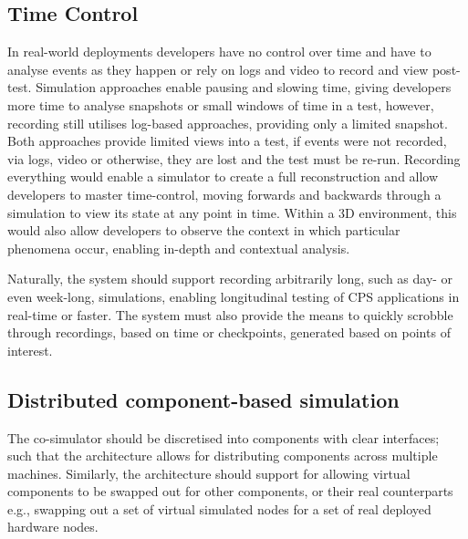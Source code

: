 \subsection{Time Control}
\label{sub:requirements_Time Control}
In real-world deployments developers have no control over time and have to analyse events as they happen or rely on logs and video to record and view post-test. Simulation approaches enable pausing and slowing time, giving developers more time to analyse snapshots or small windows of time in a test, however, recording still utilises log-based approaches, providing only a limited snapshot. Both approaches provide limited views into a test, if events were not recorded, via logs, video or otherwise, they are lost and the test must be re-run.
Recording everything would enable a simulator to create a full reconstruction and allow developers to master time-control, moving forwards and backwards through a simulation to view its state at any point in time. Within a 3D environment, this would also allow developers to observe the context in which particular phenomena occur, enabling in-depth and contextual analysis.

Naturally, the system should support recording arbitrarily long, such as day- or even week-long, simulations, enabling longitudinal testing of CPS applications in real-time or faster. The system must also provide the means to quickly scrobble through recordings, based on time or checkpoints, generated based on points of interest.

\subsection{Distributed component-based simulation} %
\label{sub:distributed}
The co-simulator should be discretised into components with clear interfaces; such that the architecture allows for distributing components across multiple machines. Similarly, the architecture should support for allowing virtual components to be swapped out for other components, or their real counterparts e.g., swapping out a set of virtual simulated nodes for a set of real deployed hardware nodes.



